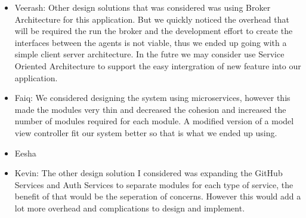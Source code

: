 \documentclass[12pt, titlepage]{article}
\begin{document}
\begin{enumerate}
		\begin{itemize}
			\item Veerash: Other design solutions that was considered was using Broker Architecture for this application. But we quickly noticed the overhead that will be required the run the broker and the development effort to create the interfaces between the agents is not viable, thus we ended up going with a simple client server architecture. In the futre we may consider use Service Oriented Architecture to support the easy intergration of new feature into our application.
			\item Faiq: We considered designing the system using microservices, however this made the modules very thin and decreased the cohesion and increased the number of modules required for each module. A modified version of a model view controller fit our system better so that is what we ended up using.
			\item Eesha
			\item Kevin: The other design solution I considered was expanding the GitHub Services and Auth Services to separate modules for each type of service, the benefit of that would be the seperation of concerns. However this would add a lot more overhead and complications to design and implement.
			
		\end{itemize}
	\end{enumerate}
	
\end{document}
